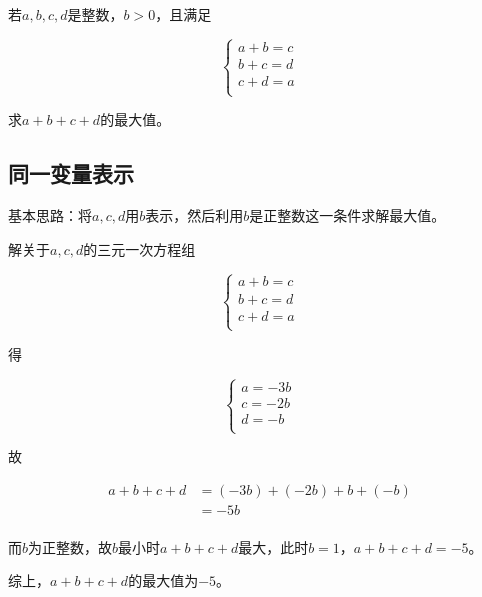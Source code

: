 

若$a, b, c, d$是整数，$b > 0$，且满足

\[ \begin{cases}
  a + b = c \\
  b + c = d \\
  c + d = a \\
\end{cases} \]

求$a + b + c + d$的最大值。


\subsection{同一变量表示}

基本思路：将$a, c, d$用$b$表示，然后利用$b$是正整数这一条件求解最大值。

解关于$a, c, d$的三元一次方程组

\[ \begin{cases}
  a + b = c \\
  b + c = d \\
  c + d = a \\
\end{cases} \]

得

\[ \begin{cases}
  a = -3b \\
  c = -2b \\
  d = -b \\
\end{cases} \]

故

\begin{align*}
  a + b + c + d &= (-3b) + (-2b) + b + (-b) \\
  &= -5b \\
\end{align*}

而$b$为正整数，故$b$最小时$a + b + c + d$最大，此时$b = 1$，$a + b + c + d = -5$。

综上，$a + b + c + d$的最大值为$-5$。
